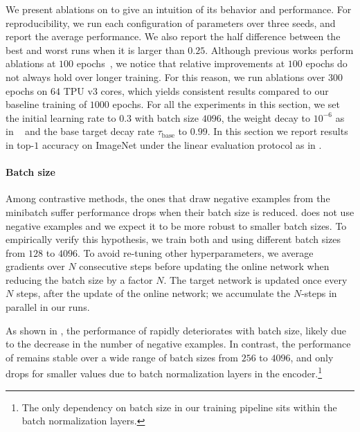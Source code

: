 \label{sec:contrast}
We present ablations on \algo to give an intuition of its behavior and performance. For reproducibility, we run each configuration of parameters over three seeds, and report the average performance. We also report the half difference between the best and worst runs when it is larger than $0.25$. Although previous works perform ablations at $100$ epochs~\cite{SimCLR,Tian2020WhatMF}, we notice that relative improvements at $100$ epochs do not always hold over longer training. For this reason, we run ablations over $300$ epochs on $64$ TPU v$3$ cores, which yields consistent results compared to our baseline training of $1000$ epochs. For all the experiments in this section, we set the initial learning rate to $0.3$ with batch size $4096$, the weight decay to $10^{-6}$ as in \simclr~\cite{SimCLR} and the base target decay rate $\tau_\text{base}$ to $0.99$. In this section we report results in top-$1$ accuracy on ImageNet under the linear evaluation protocol as in .


\paragraph{Batch size}
Among contrastive methods, the ones that draw negative examples from the minibatch suffer  performance drops when their batch size is reduced. \algo does not use negative examples and we expect it to be 
more robust to smaller batch sizes. To empirically verify this hypothesis, we train both \algo and \simclr using different batch sizes from $128$ to $4096$. To avoid re-tuning other hyperparameters, we average gradients over $N$ consecutive steps before updating the online network when reducing the batch size by a factor $N$. The target network is updated once every $N$ steps, after the update of the online network; we accumulate the $N$-steps in parallel in our runs.

As shown in , the performance of \simclr rapidly deteriorates with batch size, likely due to the decrease in the number of negative examples. In contrast, the performance of \algo remains stable over a wide range of batch sizes from $256$ to $4096$, and only drops for smaller values due to batch normalization layers in the encoder.\footnote{The only dependency on batch size in our training pipeline sits within the batch normalization layers.}

